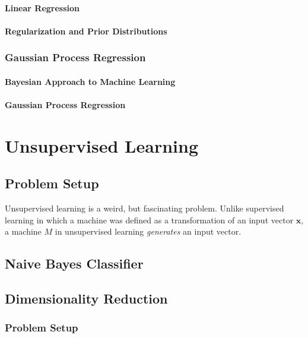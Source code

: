 \documentclass{report}
\newcommand{\vect}[1]{\mathbf{#1}}
\newcommand{\vx}[0]{\vect{x}}
\newcommand{\todo}[1]{{\Large\textcolor{red}{#1}}}
\begin{document}
\subsubsection{Linear Regression}

\subsubsection{Regularization and Prior Distributions}

\subsection{Gaussian Process Regression}

\subsubsection{Bayesian Approach to Machine Learning}

\subsubsection{Gaussian Process Regression}


\chapter{Unsupervised Learning}
\label{chap:unsupervised}

\section{Problem Setup}

Unsupervised learning is a weird, but fascinating problem. Unlike supervised
learning in which a machine was defined as a transformation of an input vector
$\vx$, a machine $M$ in unsupervised learning {\it generates} an input vector.

\section{Naive Bayes Classifier}

\todo{}

\section{Dimensionality Reduction}
\label{sec:dimred}

\subsection{Problem Setup}
\end{document}
